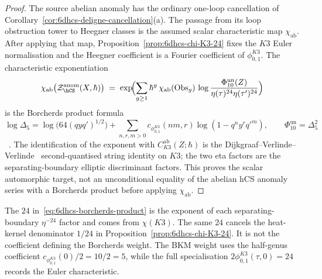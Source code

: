 \begin{proof}
The source abelian anomaly has the ordinary one-loop cancellation of
Corollary~\ref{cor:6dhcs-deligne-cancellation}\textup{(a)}. The passage from its
loop obstruction tower to Heegner classes is the assumed scalar
characteristic map \(\chi_{\mathrm{ab}}\). After applying that map,
Proposition~\ref{prop:6dhcs-chi-K3-24} fixes the \(K3\) Euler
normalisation and the Heegner coefficient is a Fourier coefficient of
\(\phi_{0,1}^{K3}\). The characteristic exponentiation
\[
 \chi_{\mathrm{ab}}\bigl(\mathcal Z_{\hCS}^{\mathrm{anom}}(X,\hbar)\bigr)
 \;=\;
 \exp\!\Bigl(\sum_{g\geq 1}\hbar^g\,\chi_{\mathrm{ab}}(\mathrm{Obs}_g)\,
 \log\frac{\Phi_{10}^{\mathrm{un}}(Z)}
 {\eta(\tau)^{24}\eta(\tau')^{24}}\Bigr)
\]
is the Borcherds product formula
\[
\log\Delta_5
=\log\bigl(64(qyq')^{1/2}\bigr)
+\sum_{n,r,m>0}c_{\phi_{0,1}^{K3}}(nm,r)
\log(1-q^ny^rq'^m),
\qquad
\Phi_{10}^{\mathrm{un}}=\Delta_5^2
\]
~\cite[Thm.\,4.1]{GritsenkoNikulin1998}. The
identification of the exponent with \(C_{K3}^{\mathrm{ab}}(Z;\hbar)\) is the
Dijkgraaf--Verlinde--Verlinde~\cite[eq.\,(5.22)]{DijkgraafVerlindeVerlinde1997}
second-quantised string identity on $K3$; the two eta factors are the
separating-boundary elliptic discriminant factors. This proves the
scalar automorphic target, not an
unconditional equality of the abelian hCS anomaly series with a
Borcherds product before applying \(\chi_{\mathrm{ab}}\).
\end{proof}

\begin{remark}
\label{rem:6dhcs-three-24}
The \(24\) in~\eqref{eq:6dhcs-borcherds-product} is the exponent of
each separating-boundary \(\eta^{-24}\) factor and comes from
\(\chi(K3)\). The same \(24\) cancels the
heat-kernel denominator \(1/24\) in
Proposition~\ref{prop:6dhcs-chi-K3-24}. It is not the coefficient
defining the Borcherds weight. The BKM weight uses the half-genus
coefficient \(c_{\phi_{0,1}^{K3}}(0)/2=10/2=5\), while the full
specialisation \(2\phi_{0,1}^{K3}(\tau,0)=24\) records the Euler
characteristic.
\end{remark}

